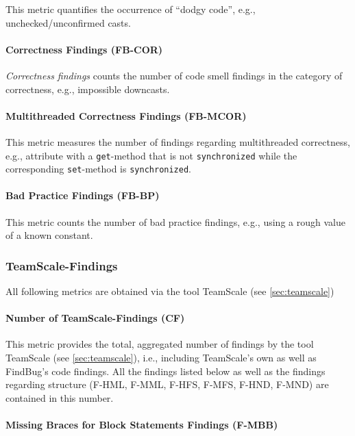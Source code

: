 \documentclass{scrartcl}
\begin{document}
This metric quantifies the occurrence of \enquote{dodgy code}, e.g.,
unchecked/unconfirmed casts.

\paragraph{Correctness Findings (FB-COR)}

\emph{Correctness findings} counts the number of code smell findings in the
category of correctness, e.g., impossible downcasts.

\paragraph{Multithreaded Correctness Findings (FB-MCOR)}

This metric measures the number of findings regarding multithreaded correctness,
e.g., attribute with a \texttt{get}-method that is not \texttt{synchronized}
while the corresponding \texttt{set}-method is \texttt{synchronized}.

\paragraph{Bad Practice Findings (FB-BP)}

This metric counts the number of bad practice findings, e.g., using a rough
value of a known constant.

\subsubsection{TeamScale-Findings}

All following metrics are obtained via the tool TeamScale (see
\ref{sec:teamscale})

\paragraph{Number of TeamScale-Findings (CF)}

This metric provides the total, aggregated number of findings by the tool
TeamScale (see \ref{sec:teamscale}), i.e., including TeamScale's own as well as
FindBug's code findings. All the findings listed below as well as the findings
regarding structure (F-HML, F-MML, F-HFS, F-MFS, F-HND, F-MND) are contained in
this number.

\paragraph{Missing Braces for Block Statements Findings (F-MBB)}
\end{document}
